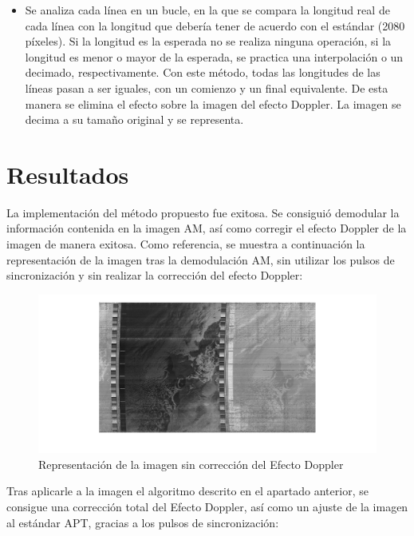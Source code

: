 \documentclass[a4paper,openright,12pt]{article}
\begin{document}
\begin{itemize}
\begin{itemize}
	\item Se analiza cada línea en un bucle, en la que se compara la longitud real de cada línea con la longitud que debería tener de acuerdo con el estándar (2080 píxeles). Si la longitud es la esperada no se realiza ninguna operación, si la longitud es menor o mayor de la esperada, se practica una interpolación o un decimado, respectivamente. Con este método, todas las longitudes de las líneas pasan a ser iguales, con un comienzo y un final equivalente. De esta manera se elimina el efecto sobre la imagen del efecto Doppler. La imagen se decima a su tamaño original y se representa.
	




\end{itemize}
	

	
	
	\end{itemize}

\section{Resultados}

La implementación del método propuesto fue exitosa. Se consiguió demodular la información contenida en la imagen AM, así como corregir el efecto Doppler de la imagen de manera exitosa. Como referencia, se muestra a continuación la representación de la imagen tras la demodulación AM, sin utilizar los pulsos de sincronización y sin realizar la corrección del efecto Doppler:


 \begin{figure}[hbtp]
 \centering
 \includegraphics[width = 17cm]{imagenes/APT_nosynch.png}
 \caption{Representación de la imagen sin corrección del Efecto Doppler}
 \label{apt_nosynch}
 \end{figure}
 
 Tras aplicarle a la imagen el algoritmo descrito en el apartado anterior, se consigue una corrección total del Efecto Doppler, así como un ajuste de la imagen al estándar APT, gracias a los pulsos de sincronización:
\end{document}

